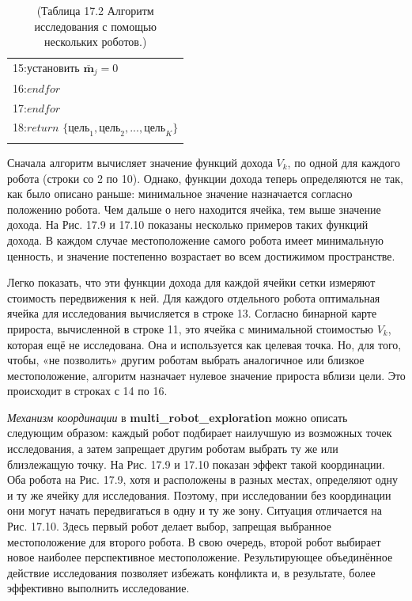 \documentclass[10pt,a4paper]{article}
\begin{document}
\begin{table}[H]
\begin{center}
\begin{tabular}{|l|}
15:\hspace{14mm}$\textit{установить}\,\,\bar{\textbf{m}}_j=0$\\
16:\hspace{9mm}$\textit{endfor}$\\
17:\hspace{4mm}$\textit{endfor}$\\
18:\hspace{4mm}$\textit{return}\,\,\{\text{цель}_1,\text{цель}_2,...,\text{цель}_K\}$\\
{}\\
\hline
\end{tabular}
\caption{(Таблица 17.2 Алгоритм исследования с помощью нескольких роботов.)}
\end{center}
\end{table}

Сначала алгоритм вычисляет значение функций дохода $V_k$, по одной для каждого робота (строки со 2 по 10). Однако, функции дохода теперь определяются не так, как было описано раньше:  минимальное значение назначается согласно положению робота. Чем дальше о него находится ячейка, тем выше значение дохода. На Рис. 17.9 и 17.10 показаны несколько примеров таких функций дохода. В каждом случае местоположение самого робота имеет минимальную ценность, и значение постепенно возрастает во всем достижимом пространстве.

Легко показать, что эти функции дохода для каждой ячейки сетки измеряют стоимость передвижения к ней. Для каждого отдельного робота оптимальная ячейка для исследования вычисляется в строке 13. Согласно бинарной карте прироста, вычисленной в строке 11, это ячейка с минимальной стоимостью  $V_k$, которая ещё не исследована. Она и используется как целевая точка. Но, для того, чтобы, «не позволить» другим роботам  выбрать аналогичное или близкое местоположение, алгоритм назначает нулевое значение прироста вблизи цели. Это происходит в строках с 14 по 16.

\textit{Механизм координации} в \textbf{multi\_robot\_exploration} можно описать следующим образом: каждый робот подбирает наилучшую из возможных точек исследования, а затем запрещает другим роботам выбрать ту же или близлежащую точку. На Рис. 17.9 и 17.10 показан эффект такой координации. Оба робота на Рис. 17.9, хотя и расположены в разных местах, определяют одну и ту же ячейку для исследования. Поэтому, при исследовании без координации они могут начать передвигаться в одну и ту же зону. Ситуация отличается на Рис. 17.10. Здесь первый робот делает выбор, запрещая выбранное местоположение для второго робота. В свою очередь, второй робот выбирает новое наиболее перспективное местоположение. Результирующее объединённое действие исследования позволяет избежать конфликта и, в результате, более эффективно выполнить исследование.
\end{document}
